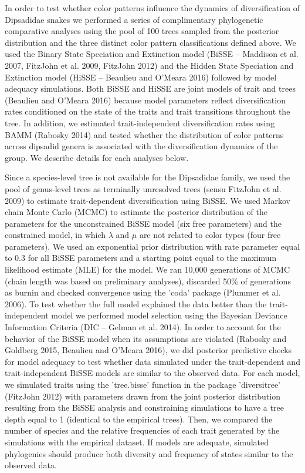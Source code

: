 In order to test whether color patterns influence the dynamics of diversification of Dipsadidae snakes we performed a series of complimentary phylogenetic comparative analyses using the pool of 100 trees sampled from the posterior distribution and the three distinct color pattern classifications defined above. We used the Binary State Speciation and Extinction model (BiSSE – Maddison et al. 2007, FitzJohn et al. 2009, FitzJohn 2012) and the Hidden State Speciation and Extinction model (HiSSE – Beaulieu and O'Meara 2016) followed by model adequacy simulations. Both BiSSE and HiSSE are joint models of trait and trees (Beaulieu and O'Meara 2016) because model parameters reflect diversification rates conditioned on the state of the traits and trait transitions throughout the tree. In addition, we estimated trait-independent diversification rates using BAMM (Rabosky 2014) and tested whether the distribution of color patterns across dipsadid genera is associated with the diversification dynamics of the group. We describe details for each analyses below.

Since a species-level tree is not available for the Dipsadidae family, we used the pool of genus-level trees as terminally unresolved trees (sensu FitzJohn et al. 2009) to estimate trait-dependent diversification using BiSSE. We used Markov chain Monte Carlo (MCMC) to estimate the posterior distribution of the parameters for the unconstrained BiSSE model (six free parameters) and the constrained model, in which $\lambda$ and $\mu$ are not related to color types (four free parameters). We used an exponential prior distribution with rate parameter equal to 0.3 for all BiSSE parameters and a starting point equal to the maximum likelihood estimate (MLE) for the model. We ran 10,000 generations of MCMC (chain length was based on preliminary analyses), discarded 50\% of generations as burnin and checked convergence using the 'coda' package (Plummer et al. 2006). To test whether the full model explained the data better than the trait-independent model we performed model selection using the Bayesian Deviance Information Criteria (DIC – Gelman et al. 2014). In order to account for the behavior of the BiSSE model when its assumptions are violated (Rabosky and Goldberg 2015, Beaulieu and O'Meara 2016), we did posterior predictive checks for model adequacy to test whether data simulated under the trait-dependent and trait-independent BiSSE models are similar to the observed data. For each model, we simulated traits using the 'tree.bisse' function in the package 'diversitree' (FitzJohn 2012) with parameters drawn from the joint posterior distribution resulting from the BiSSE analysis and constraining simulations to have a tree depth equal to 1 (identical to the empirical trees). Then, we compared the number of species and the relative frequencies of each trait generated by the simulations with the empirical dataset. If models are adequate, simulated phylogenies should produce both diversity and frequency of states similar to the observed data.

